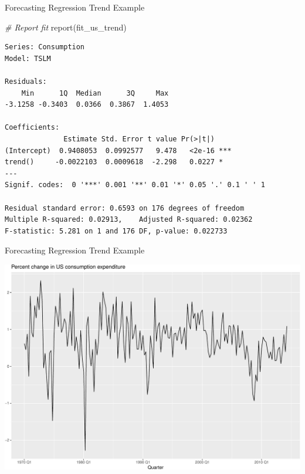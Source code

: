 \documentclass[
  ignorenonframetext,
]{beamer}
\newenvironment{Shaded}{\begin{snugshade}}{\end{snugshade}}
\newcommand{\CommentTok}[1]{\textcolor[rgb]{0.56,0.35,0.01}{\textit{#1}}}
\newcommand{\FunctionTok}[1]{\textcolor[rgb]{0.00,0.00,0.00}{#1}}
\newcommand{\NormalTok}[1]{#1}
\begin{document}
\begin{frame}[fragile]{Forecasting \textbar{} \small Regression Trend
Example}
\protect\hypertarget{forecasting-regression-trend-example-1}{}
\footnotesize

\normalfont

\footnotesize

\begin{Shaded}
\begin{Highlighting}[]
\CommentTok{\# Report fit}
\FunctionTok{report}\NormalTok{(fit\_us\_trend)}
\end{Highlighting}
\end{Shaded}

\begin{verbatim}
Series: Consumption 
Model: TSLM 

Residuals:
    Min      1Q  Median      3Q     Max 
-3.1258 -0.3403  0.0366  0.3867  1.4053 

Coefficients:
              Estimate Std. Error t value Pr(>|t|)    
(Intercept)  0.9408053  0.0992577   9.478   <2e-16 ***
trend()     -0.0022103  0.0009618  -2.298   0.0227 *  
---
Signif. codes:  0 '***' 0.001 '**' 0.01 '*' 0.05 '.' 0.1 ' ' 1

Residual standard error: 0.6593 on 176 degrees of freedom
Multiple R-squared: 0.02913,    Adjusted R-squared: 0.02362
F-statistic: 5.281 on 1 and 176 DF, p-value: 0.022733
\end{verbatim}

\normalfont
\end{frame}

\begin{frame}{Forecasting \textbar{} \small Regression Trend Example}
\protect\hypertarget{forecasting-regression-trend-example-2}{}
\footnotesize

\includegraphics{Time-series-regression-models_files/figure-beamer/unnamed-chunk-35-1.pdf}

\normalfont
\end{frame}
\end{document}
